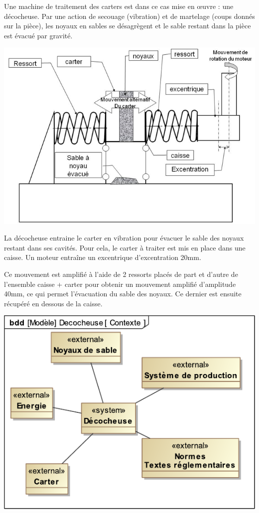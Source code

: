 Une machine de traitement des carters est dans ce cas mise en \oe uvre : une décocheuse. Par une action de secouage (vibration) et de martelage (coups donnés sur la pièce), les noyaux en sables se désagrègent et le sable restant dans la pièce est évacué par gravité.

\begin{center}
	\includegraphics[width=0.7\linewidth]{img/05}
\end{center}

\begin{minipage}{0.55\linewidth}
La décocheuse entraine le carter en vibration pour évacuer le sable des noyaux restant dans ses cavités. Pour cela, le carter à traiter est mis en place dans une caisse. Un moteur entraîne un excentrique d'excentration 20mm.

Ce mouvement est amplifié à l'aide de 2 ressorts placés de part et d'autre de l'ensemble caisse + carter pour obtenir	un mouvement amplifié d'amplitude 40mm, ce qui permet l'évacuation du sable des noyaux. Ce dernier est ensuite récupéré en dessous de la caisse.
\end{minipage}\hfill
\begin{minipage}{0.55\linewidth}
\begin{center}
	\includegraphics[width=0.7\linewidth]{img/Decocheuse_Contexte}
\end{center}
\end{minipage}

